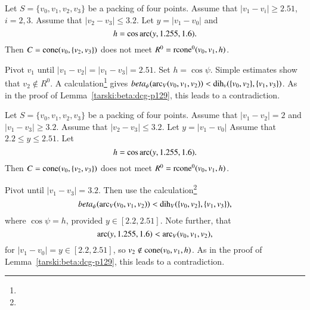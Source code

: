 \begin{tarskidata}
\begin{tarski}

\begin{lemma}
Let $S=\{v_0,v_1,v_2,v_3\}$ be a packing of four points.
Assume that
$|v_1-v_i|\ge 2.51$, $i=2,3$.
Assume that $|v_2-v_3|\le 3.2$.
Let $y = |v_1-v_0|$ and 
$$
  h=\cos\operatorname{arc}(y,1.255,1.6).
$$
Then $C={\operatorname{cone}}(v_0,\{v_2,v_3\})$ does not meet
$R^0={\operatorname{rcone}}^0(v_0,v_1,h)$.
\end{lemma}


\begin{proved}  Pivot $v_1$ until
$|v_1-v_2|=|v_1-v_3|=2.51$.   
Set
$h=\cos\psi$. 
Simple estimates show that $v_2\not\in R^0$.
A calculation\footnote{} %
gives $beta_\psi(\operatorname{arc}_V(v_0,v_1,v_2))<\operatorname{dih}_v(\{v_0,v_2\},\{v_1,v_3\})$.
As in the proof of Lemma~\ref{tarski:beta:dcg-p129}, this leads to a contradiction.
\swallowed\end{proved}
\end{tarski}




\begin{tarski}

\begin{lemma} 
Let $S=\{v_0,v_1,v_2,v_3\}$ be a packing of four points.
Assume that
$|v_1-v_2|=2$ and $|v_1-v_3|\ge3.2$.
Assume that $|v_2-v_3|\le 3.2$. Let $y = |v_1-v_0|$
Assume that $2.2\le y\le 2.51$.
Let
$$
  h= \cos\operatorname{arc}(y,1.255,1.6).
$$
Then $C={\operatorname{cone}}(v_0,\{v_2,v_3\})$ does not meet
$R^0={\operatorname{rcone}}^0(v_0,v_1,h)$.
\end{lemma}


\begin{proved}
Pivot until
$|v_1-v_3|=3.2$. Then use the calculation\footnote{} %
    $$beta_\psi(\operatorname{arc}_V(v_0,v_1,v_2))< \operatorname{dih}_V(\{v_0,v_2\},\{v_1,v_3\}),$$
where $\cos\psi=h$,
provided $y\in[2.2,2.51]$. Note further, that
    $$\operatorname{arc}(y,1.255,1.6)<\operatorname{arc}_V(v_0,v_1,v_2),$$
for $|v_1-v_0|=y\in[2.2,2.51]$, 
so $v_2\not\in{\operatorname{cone}}(v_0,v_1,h)$.
As in the proof of Lemma~\ref{tarski:beta:dcg-p129}, this leads to a contradiction.
\swallowed\end{proved}
\end{tarski}







\end{tarskidata}
